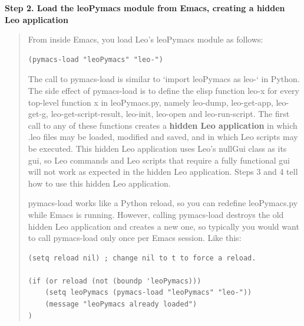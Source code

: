 \documentclass[a4paper,10pt,english]{sphinxmanual}
\begin{document}
\textbf{Step 2. Load the leoPymacs module from Emacs, creating a hidden Leo application}
\begin{quote}

From inside Emacs, you load Leo's leoPymacs module as follows:

\begin{Verbatim}[commandchars=\\\{\}]
(pymacs-load "leoPymacs" "leo-")
\end{Verbatim}

The call to pymacs-load is similar to `import leoPymacs as leo-` in Python.
The side effect of pymacs-load is to define the elisp function leo-x for every top-level function x in leoPymacs.py,
namely leo-dump, leo-get-app, leo-get-g, leo-get-script-result, leo-init, leo-open and leo-run-script.
The first call to any of these functions creates a \textbf{hidden Leo application}
in which .leo files may be loaded, modified and saved,
and in which Leo scripts may be executed.
This hidden Leo application uses Leo's nullGui class as its gui,
so Leo commands and Leo scripts that require a fully functional gui will not work as
expected in the hidden Leo application.
Steps 3 and 4 tell how to use this hidden Leo application.

pymacs-load works like a Python reload, so you can redefine leoPymacs.py while Emacs is running.
However, calling pymacs-load destroys the old hidden Leo application and creates a new one,
so typically you would want to call pymacs-load only once per Emacs session.
Like this:

\begin{Verbatim}[commandchars=\\\{\}]
(setq reload nil) ; change nil to t to force a reload.

(if (or reload (not (boundp 'leoPymacs)))
    (setq leoPymacs (pymacs-load "leoPymacs" "leo-"))
    (message "leoPymacs already loaded")
)
\end{Verbatim}
\end{quote}
\end{document}
